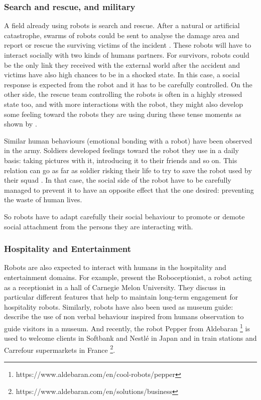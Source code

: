 \subsubsection{Search and rescue, and military} 
	
    A field already using robots is search and rescue. After a natural or
    artificial catastrophe, swarms of robots could be sent to analyse the damage
    area and report or rescue the surviving victims of the incident
    \citep{liu2013robotic}. These robots will have to interact socially with two
    kinds of humans partners. For survivors, robots could be the only link they
    received with the external world after the accident and victims have also
    high chances to be in a shocked state. In this case, a social response is
    expected from the robot and it has to be carefully controlled. On the other
    side, the rescue team controlling the robots is often in a highly stressed
    state too, and with more interactions with the robot, they might also
    develop some feeling toward the robots they are using during these tense
    moments as shown by \citet{fincannon2004evidence}.
	
    Similar human behaviours (emotional bonding with a robot) have been observed
    in the army. Soldiers developed feelings toward the robot they use in a
    daily basis: taking pictures with it, introducing it to their friends and so
    on. This relation can go as far as soldier risking their life to try to save
    the robot used by their squad \citep{singer2009wired}. In that case, the
    social side of the robot have to be carefully managed to prevent it to have
    an opposite effect that the one desired: preventing the waste of human
    lives.
	
    So robots have to adapt carefully their social behaviour to promote or
    demote social attachment from the persons they are interacting with.
	
\subsubsection{Hospitality and Entertainment} 
	
    Robots are also expected to interact with humans in the hospitality and
    entertainment domains. For example, \citet{gockley2005designing} present the
    Roboceptionist, a robot acting as a receptionist in a hall of Carnegie Melon
    University. They discuss in particular different features that help to
    maintain long-term engagement for hospitality robots. Similarly, robots have
    also been used as museum guide: \citet{karreman2012contextual} describe the
    use of non verbal behaviour inspired from humans observation to guide
    visitors in a museum. And recently, the robot Pepper from Aldebaran
    \footnote{https://www.aldebaran.com/en/cool-robots/pepper} is used to
    welcome clients in Softbank and Nestl\'{e} in Japan and in train stations
    and Carrefour supermarkets in France
    \footnote{https://www.aldebaran.com/en/solutions/business}. 
	
